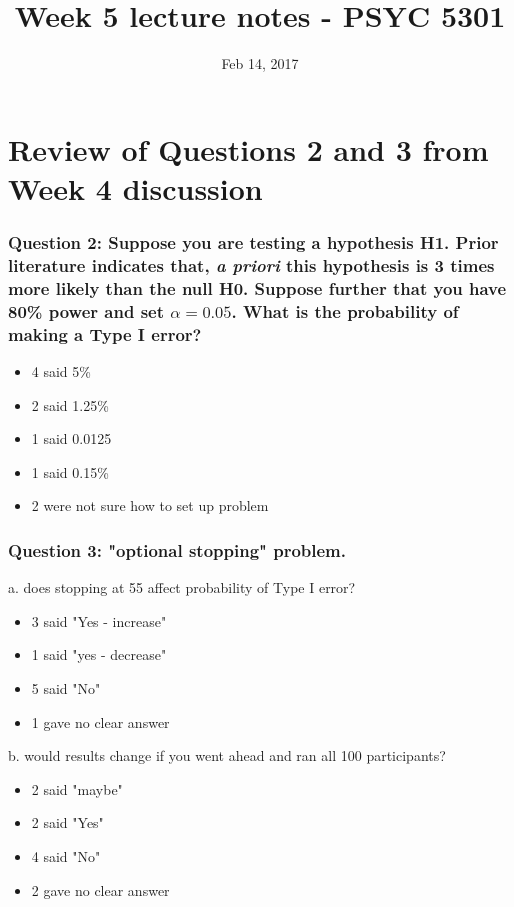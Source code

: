 \documentclass[11pt]{article}
\date{Feb 14, 2017}
\title{Week 5 lecture notes - PSYC 5301}
\begin{document}
\maketitle

\section*{Review of Questions 2 and 3 from Week 4 discussion}
\label{sec-1}

\subsubsection*{Question 2: Suppose you are testing a hypothesis H1.  Prior literature indicates that, \emph{a priori} this hypothesis is 3 times more likely than the null H0.  Suppose further that you have 80\% power and set $\alpha=0.05$.  What is the probability of making a Type I error?}
\label{sec-1-0-1}

\begin{itemize}
\item 4 said 5\%
\item 2 said 1.25\%
\item 1 said 0.0125
\item 1 said 0.15\%
\item 2 were not sure how to set up problem
\end{itemize}

\subsubsection*{Question 3: "optional stopping" problem.}
\label{sec-1-0-2}

a. does stopping at 55 affect probability of Type I error?
\begin{itemize}
\item 3 said "Yes - increase"
\item 1 said "yes - decrease"
\item 5 said "No"
\item 1 gave no clear answer
\end{itemize}

b. would results change if you went ahead and ran all 100 participants?
\begin{itemize}
\item 2 said "maybe"
\item 2 said "Yes"
\item 4 said "No"
\item 2 gave no clear answer
\end{itemize}
\end{document}
